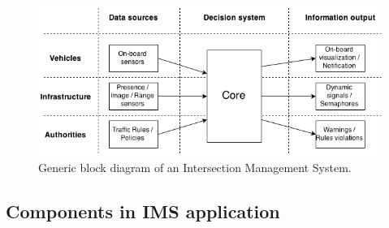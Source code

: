 
\begin{figure}[ht!]
\centering
\includegraphics[scale=0.55]{fig/2/genericIMS.png}
\caption{Generic block diagram of an Intersection Management System.}
\label{arch}
\end{figure}




\subsection{Components in IMS application}

